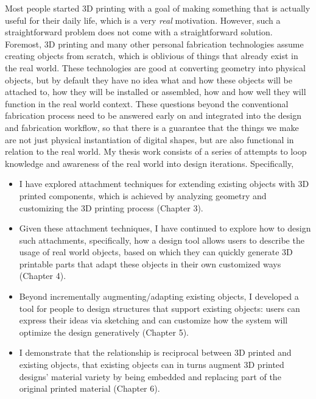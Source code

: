 %
Most people started 3D printing with a goal of making something that is actually useful for their daily life, which is a very \textit{real} motivation. However, such a straightforward problem does not come with a straightforward solution. Foremost, 3D printing and many other personal fabrication technologies assume creating objects from scratch, which is oblivious of things that already exist in the real world. These technologies are good at converting geometry into physical objects, but by default they have no idea what and how these objects will be attached to, how they will be installed or assembled, how and how well they will function in the real world context. These questions beyond the conventional fabrication process need to be answered early on and integrated into the design and fabrication workflow, so that there is a guarantee that the things we make are not just physical instantiation of digital shapes, but are also functional in relation to the real world. My thesis work consists of a series of attempts to loop knowledge and awareness of the real world into design iterations. Specifically,

\begin{itemize}
	\item I have explored attachment techniques for extending existing objects with 3D printed components, which is achieved by analyzing geometry and customizing the 3D printing process (Chapter 3).
	\item Given these attachment techniques, I have continued to explore how to design such attachments, specifically, how a design tool allows users to describe the usage of real world objects, based on which they can quickly generate 3D printable parts that adapt these objects in their own customized ways (Chapter 4).
	\item Beyond incrementally augmenting/adapting existing objects, I developed a tool for people to design structures that support existing objects: users can express their ideas via sketching and can customize how the system will optimize the design generatively (Chapter 5).
	\item I demonstrate that the relationship is reciprocal between 3D printed and existing objects, that existing objects can in turns augment 3D printed designs' material variety by being embedded and replacing part of the original printed material (Chapter 6).
\end{itemize}

